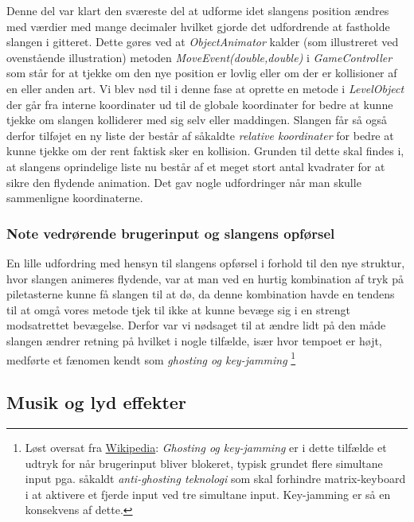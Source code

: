 \documentclass[]{article}
\begin{document}
	Denne del var klart den sværeste del at udforme idet slangens position ændres med værdier med mange decimaler hvilket gjorde det udfordrende at fastholde slangen i gitteret. Dette gøres ved at \textit{ObjectAnimator} kalder (som illustreret ved ovenstående illustration) metoden \textit{MoveEvent(double,double)} i \textit{GameController} som står for at tjekke om den nye position er lovlig eller om der er kollisioner af en eller anden art. Vi blev nød til i denne fase at oprette en metode i \textit{LevelObject} der går fra interne koordinater ud til de globale koordinater for bedre at kunne tjekke om slangen kolliderer med sig selv eller maddingen. Slangen får så også derfor tilføjet en ny liste der består af såkaldte \textit{relative koordinater} for bedre at kunne tjekke om der rent faktisk sker en kollision. Grunden til dette skal findes i, at slangens oprindelige liste nu består af et meget stort antal kvadrater for at sikre den flydende animation. Det gav nogle udfordringer når man skulle sammenligne koordinaterne.\\
	
	\subsubsection{Note vedrørende brugerinput og slangens opførsel}
	
	En lille udfordring med hensyn til slangens opførsel i forhold til den nye struktur, hvor slangen animeres flydende, var at man ved en hurtig kombination af tryk på piletasterne kunne få slangen til at dø, da denne kombination havde en tendens til at omgå vores metode tjek til ikke at kunne bevæge sig i en strengt modsatrettet bevægelse. Derfor var vi nødsaget til at ændre lidt på den måde slangen ændrer retning på hvilket i nogle tilfælde, især hvor tempoet er højt, medførte et fænomen kendt som \textit{ghosting og key-jamming} \footnote{Løst oversat fra \href{https://en.wikipedia.org/wiki/Rollover_(key)}{Wikipedia}: \textit{Ghosting og key-jamming} er i dette tilfælde et udtryk for når brugerinput bliver blokeret, typisk grundet flere simultane input pga. såkaldt \textit{anti-ghosting teknologi} som skal forhindre matrix-keyboard i at aktivere et fjerde input ved tre simultane input. Key-jamming er så en konsekvens af dette.}
	
	\subsection{Musik og lyd effekter}
	
\end{document}
